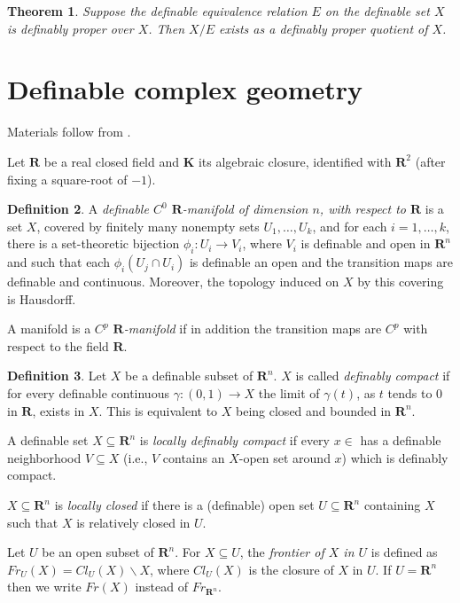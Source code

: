 \documentclass{amsart}
\newtheorem{theorem}{Theorem}[subsection]
\theoremstyle{definition}
\newtheorem{definition}[theorem]{Definition}
\numberwithin{equation}{section}
\begin{document}
\begin{theorem}
    Suppose the definable equivalence relation $E$ on the definable set $X$ is definably proper over $X$.
    Then $X/E$ exists as a definably proper quotient of $X$.
\end{theorem}

\section{Definable complex geometry}
Materials follow from \cite{MR2441378}.

Let $\mathbf{R}$ be a real closed field and $\mathbf{K}$ its algebraic closure,
identified with $\mathbf{R}^2$ (after fixing a square-root of $-1$).

\begin{definition}
    A \emph{definable $C^0$ $\mathbf{R}$-manifold of dimension $n$, with respect to $\mathbf{R}$} is a set $X$,
    covered by finitely many nonempty sets $U_1, \dots, U_k$,
    and for each $i = 1, \dots, k$,
    there is a set-theoretic bijection $\phi_i:U_i \to V_i$,
    where $V_i$ is definable and open in $\mathbf{R}^n$ and such that each $\phi_i(U_j\cap U_i)$ is definable an open
    and the transition maps are definable and continuous.
    Moreover, the topology induced on $X$ by this covering is Hausdorff.

    A manifold is a \emph{$C^p$ $\mathbf{R}$-manifold} if in addition
    the transition maps are $C^p$ with respect to the field $\mathbf{R}$.
\end{definition}

\begin{definition}
    Let $X$ be a definable subset of $\mathbf{R}^n$.
    $X$ is called \emph{definably compact} if for every definable continuous $\gamma:(0,1) \to X$ the limit of $\gamma(t)$,
    as $t$ tends to $0$ in $\mathbf{R}$, exists in $X$.
    This is equivalent to $X$ being closed and bounded in $\mathbf{R}^n$.

    A definable set $X \subseteq \mathbf{R}^n$ is \emph{locally definably compact}
    if every $x \in $ has a definable neighborhood $V\subseteq X$
    (i.e., $V$ contains an $X$-open set around $x$)
    which is definably compact.

    $X \subseteq \mathbf{R}^n$ is \emph{locally closed} if there is a (definable) open set $U \subseteq \mathbf{R}^n$ containing $X$
    such that $X$ is relatively closed in $U$.

    Let $U$ be an open subset of $\mathbf{R}^n$.
    For $X \subseteq U$,
    the \emph{frontier of $X$ in $U$} is defined as $Fr_U(X) = Cl_U(X)\backslash X$,
    where $Cl_U(X)$ is the closure of $X$ in $U$.
    If $U = \mathbf{R}^n$ then we write $Fr(X)$ instead of $Fr_{\mathbf{R}^n}$.  
\end{definition}
\end{document}
